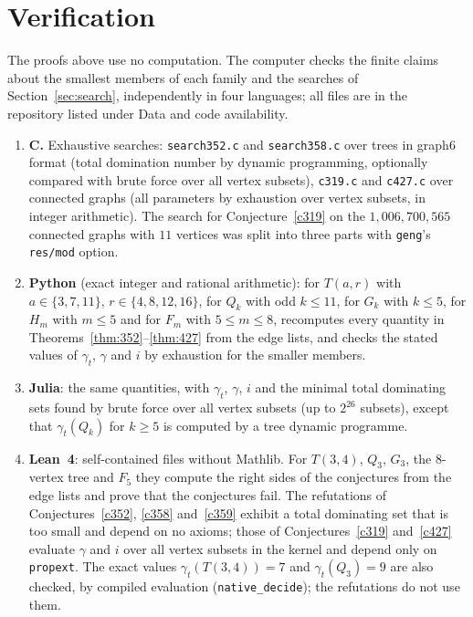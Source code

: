 \documentclass[11pt]{amsart}
\theoremstyle{definition}
\theoremstyle{remark}
\numberwithin{equation}{section}
\newcommand{\gt}{\gamma_t}
\begin{document}
\appendix

\section{Verification}\label{app:verification}

The proofs above use no computation. The computer checks the finite claims about the smallest members of each family and the searches of Section~\ref{sec:search}, independently in four languages; all files are in the repository listed under Data and code availability.
\begin{enumerate}
\item \textbf{C.} Exhaustive searches: \texttt{search352.c} and \texttt{search358.c} over trees in graph6 format (total domination number by dynamic programming, optionally compared with brute force over all vertex subsets), \texttt{c319.c} and \texttt{c427.c} over connected graphs (all parameters by exhaustion over vertex subsets, in integer arithmetic). The search for Conjecture~\ref{c319} on the $1{,}006{,}700{,}565$ connected graphs with $11$ vertices was split into three parts with \texttt{geng}'s \texttt{res/mod} option.
\item \textbf{Python} (exact integer and rational arithmetic): for $T(a,r)$ with $a\in\{3,7,11\}$, $r\in\{4,8,12,16\}$, for $Q_k$ with odd $k\le11$, for $G_k$ with $k\le5$, for $H_m$ with $m\le5$ and for $F_m$ with $5\le m\le8$, recomputes every quantity in Theorems~\ref{thm:352}--\ref{thm:427} from the edge lists, and checks the stated values of $\gt$, $\gamma$ and $i$ by exhaustion for the smaller members.
\item \textbf{Julia}: the same quantities, with $\gt$, $\gamma$, $i$ and the minimal total dominating sets found by brute force over all vertex subsets (up to $2^{26}$ subsets), except that $\gt(Q_k)$ for $k\ge5$ is computed by a tree dynamic programme.
\item \textbf{Lean~4}: self-contained files without Mathlib. For $T(3,4)$, $Q_3$, $G_3$, the $8$-vertex tree and $F_5$ they compute the right sides of the conjectures from the edge lists and prove that the conjectures fail. The refutations of Conjectures~\ref{c352}, \ref{c358} and~\ref{c359} exhibit a total dominating set that is too small and depend on no axioms; those of Conjectures~\ref{c319} and~\ref{c427} evaluate $\gamma$ and $i$ over all vertex subsets in the kernel and depend only on \texttt{propext}. The exact values $\gt(T(3,4))=7$ and $\gt(Q_3)=9$ are also checked, by compiled evaluation (\texttt{native\_decide}); the refutations do not use them.
\end{enumerate}
\end{document}
